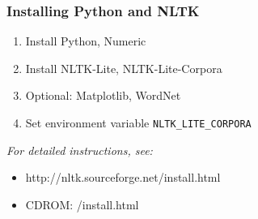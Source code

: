 \documentclass{beamer}             %
\begin{document}
\begin{frame}[fragile]
\frametitle{Installing Python and NLTK}
\begin{enumerate}
\item Install Python, Numeric
\item Install NLTK-Lite, NLTK-Lite-Corpora
\item Optional: Matplotlib, WordNet
\item Set environment variable \verb|NLTK_LITE_CORPORA|
\end{enumerate}

\textit{For detailed instructions, see:}

\begin{itemize}
\item  http://nltk.sourceforge.net/install.html
\item  CDROM: /install.html
\end{itemize}

\end{frame}
\end{document}
